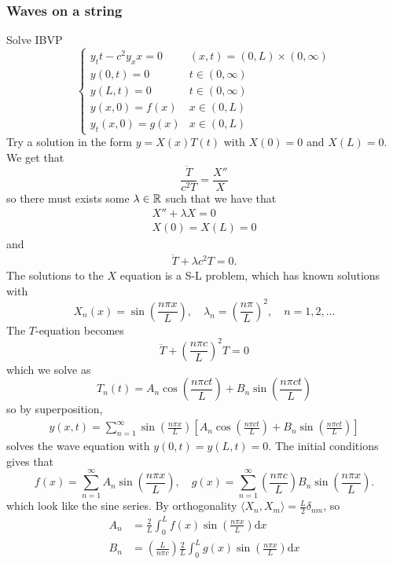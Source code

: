 \documentclass{article}
\begin{document}
\subsubsection{Waves on a string}
Solve IBVP
\[
  \begin{cases}
	  y_tt -c^2y_xx=0 & (x,t)=(0,L)\times (0,\infty) \\
	  y(0,t)=0 & t\in (0,\infty) \\
	  y(L,t)=0 & t\in (0,\infty)\\
	  y(x,0)=f(x) & x\in (0,L) \\
	  y_t(x,0)=g(x) & x\in (0,L)
  \end{cases}
\]
Try a solution in the form $ y=X(x)T(t) $ with $ X(0)=0 $ and $ X(L)=0 $. We get that
\[
	\frac{\ddot{T}}{c^2T}=\frac{X''}X
\]
so there must exists some $ \lambda\in \mathbb{R} $ such that we have that
\begin{align*}
  X''+\lambda X=0\\
  X(0)=X(L)=0
\end{align*}
and
\begin{align*}
  \ddot T+\lambda c^2T=0.
\end{align*}
The solutions to the $ X $ equation is a S-L problem, which has known solutions with
\[
	X_n(x)=\sin(\frac{n\pi x}L),\quad \lambda_n=\left(\frac{n\pi}L\right)^2,\quad n=1,2,\dots
\]
The $ T $-equation becomes
\[
	\ddot T+\left(\frac{n\pi c}L\right)^2T=0
\]
which we solve as
\[
	T_n(t)=A_n\cos(\frac{n\pi ct}L)+B_n\sin(\frac{n\pi ct}L)
\]
so by superposition,
\begin{align*}
	y(x,t)=\sum_{n=1}^\infty \sin(\frac{n\pi x}L)\left[A_n\cos(\frac{n\pi ct}L)+B_n\sin(\frac{n\pi ct}L)\right]
\end{align*}
solves the wave equation with $ y(0,t)=y(L,t)=0 $. The initial conditions gives that
\[
	f(x)=\sum_{n=1}^\infty A_n\sin(\frac{n\pi x}L),\quad g(x)=\sum_{n=1}^\infty \left(\frac{n\pi c}L\right)B_n\sin(\frac{n\pi x}L).
\]
which look like the sine series. By orthogonality $ \langle X_n,X_m\rangle=\frac L2\delta_{nm} $, so
\begin{align*}
	A_n&=\frac 2L\int_0^Lf(x)\sin(\frac{n\pi x}L)\mathrm dx\\
	B_n&=\left(\frac{L}{n\pi c}\right)\frac 2L\int_0^Lg(x)\sin(\frac{n\pi x}L)\mathrm dx
\end{align*}
\end{document}
